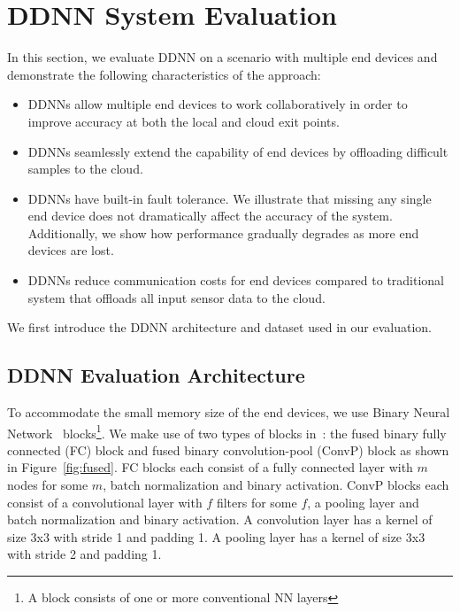 \documentclass[10pt, conference, compsocconf]{IEEEtran}
\begin{document}
\section{DDNN System Evaluation}
\label{sec:eval}
In this section, we evaluate DDNN on a scenario with multiple end devices and demonstrate the following characteristics of the approach:
\begin{itemize}
    \item DDNNs allow multiple end devices to work collaboratively in order to improve accuracy at both the local and cloud exit points.
    \item DDNNs seamlessly extend the capability of end devices by offloading difficult samples to the cloud.
    \item DDNNs have built-in fault tolerance. We illustrate that missing any single end device does not dramatically affect the accuracy of the system. Additionally, we show how performance gradually degrades as more end devices are lost.
    \item DDNNs reduce communication costs for end devices compared to traditional system that offloads all input sensor data to the cloud.%
\end{itemize}

We first introduce the DDNN architecture and dataset used in our evaluation.

\subsection{DDNN Evaluation Architecture}
To accommodate the small memory size of the end devices, we use Binary Neural Network~\cite{courbariaux2015binaryconnect} blocks\footnote{A block consists of one or more conventional NN layers}. We make use of two types of blocks in~\cite{mcdanel2016ebnn}: the fused binary fully connected (FC) block and fused binary convolution-pool (ConvP) block as shown in Figure~\ref{fig:fused}. FC blocks each consist of a fully connected layer with $m$ nodes for some $m$, batch normalization and binary activation. ConvP blocks each consist of a convolutional layer with $f$ filters for some $f$, a pooling layer and batch normalization and binary activation. A convolution layer has a kernel of size 3x3 with stride 1 and padding 1. A pooling layer has a kernel of size 3x3 with stride 2 and padding 1.
\end{document}
